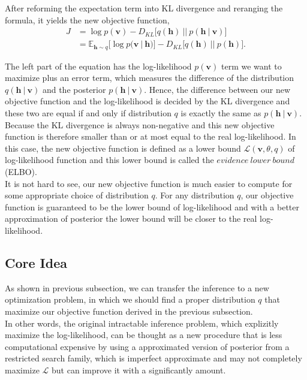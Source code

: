 \documentclass[conference]{IEEEtran}
\begin{document}
After reforming the expectation term into KL divergence and reranging the formula, it yields the new objective function,
\begin{equation}
  \begin{split}
	J &= \log p(\boldsymbol{v}) - D_{KL}\bigg[q(\boldsymbol{h})\ ||\ p(\boldsymbol{h}\ |\ \boldsymbol{v})\bigg]\\
  &=\mathbb{E}_{\boldsymbol{h}\sim q}\bigg[\log p(\boldsymbol{v}\ |\ \boldsymbol{h})\bigg]-D_{KL}\bigg[q(\boldsymbol{h})\ ||\ p(\boldsymbol{h})\bigg].
  \end{split}  
\end{equation}

The left part of the equation has the log-likelihood $p(\boldsymbol{v})$ term we want to maximize plus an error term, which measures the difference of the distribution $q(\boldsymbol{h}\ |\ \boldsymbol{v})$ and the posterior $p(\boldsymbol{h}\ |\ \boldsymbol{v})$. Hence, the difference between our new objective function and the log-likelihood is decided by the KL divergence and these two are equal if and only if distribution $q$ is exactly the same as $p(\boldsymbol{h}\ |\ \boldsymbol{v})$. Because the KL divergence is always non-negative and this new objective function is therefore smaller than or at most equal to the real log-likelihood. In this case, the new objective function is defined as a lower bound $\mathcal{L}(\boldsymbol{v}, \theta, q)$ of log-likelihood function and this lower bound is called the $evidence\ lower\ bound$(ELBO).\\

It is not hard to see, our new objective function is much easier to compute for some appropriate choice of distribution $q$. For any distribution $q$, our objective function is guaranteed to be the lower bound of log-likelihood and with a better approximation of posterior the lower bound will be closer to the real log-likelihood.
\subsection{Core Idea}
As shown in previous subsection, we can transfer the inference to a new optimization problem, in which we should find a proper distribution $q$ that maximize our objective function derived in the previous subsection. \\

In other words, the original intractable inference problem, which explizitly maximize the log-likelihood, can be thought as a new procedure that is less computational expensive  by using a approximated version of posterior from a restricted search family, which is imperfect approximate and may not completely maximize $\mathcal{L}$ but can improve it with a significantly amount.\\
\end{document}
